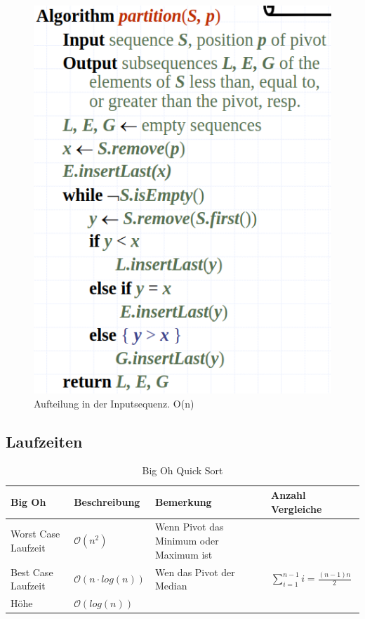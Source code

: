 \begin{figure}[h!]
	\centering
	\begin{minipage}[t]{0.6\textwidth}
		\centering
		\includegraphics[width=0.7\linewidth]{images/quicksort}
		\caption{Aufteilung in der Inputsequenz. O(n)}
		\label{fig:quicksortalg}
	\end{minipage}
\end{figure}
\clearpage
\subsection{Laufzeiten}
\begin{table}[h]
	\centering
	\begin{tabu} to \linewidth {l l X X}
		\toprule
		Big Oh & Beschreibung & Bemerkung & Anzahl Vergleiche \\
		\midrule
		Worst Case Laufzeit & $\mathcal{O}(n^2)$ & Wenn Pivot das Minimum oder Maximum ist & \\
		Best Case Laufzeit &  $\mathcal{O}(n \cdot log(n))$ & Wen das Pivot der Median & $\sum_{i=1}^{n-1} i = \frac{(n-1)n}{2}$\\
		Höhe & $\mathcal{O}(log(n))$ & \\
		\bottomrule
	\end{tabu}
	\caption{Big Oh Quick Sort}
\end{table}

